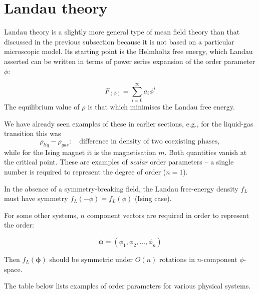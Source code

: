 \documentclass[
  letterpaper,
  enabledeprecatedfontcommands]{report}
\begin{document}
\section{Landau theory}\label{sec-landau-theory}

Landau theory is a slightly more general type of mean field theory than
that discussed in the previous subsection because it is not based on a
particular microscopic model. Its starting point is the Helmholtz free
energy, which Landau asserted can be written in terms of power series
expansion of the order parameter \(\phi\):

\[
F_(\phi)=\sum_{i=0}^{\infty}a_i\phi^i
\] The equilibrium value of \(\rho\) is that which minimises the Landau
free energy.

\begin{tcolorbox}[enhanced jigsaw, toprule=.15mm, opacityback=0, colbacktitle=quarto-callout-caution-color!10!white, title=\textcolor{quarto-callout-caution-color}{\faFire}\hspace{0.5em}{A note on order parameters}, leftrule=.75mm, rightrule=.15mm, bottomtitle=1mm, breakable, colframe=quarto-callout-caution-color-frame, colback=white, toptitle=1mm, left=2mm, titlerule=0mm, coltitle=black, arc=.35mm, bottomrule=.15mm, opacitybacktitle=0.6]

We have already seen examples of these in earlier sections, e.g., for
the liquid-gas transition this was \[
\rho_{liq} - \rho_{gas}: \quad \textrm{difference in density of two coexisting phases},
\] while for the Ising magnet it is the magnetisation \(m\). Both
quantities vanish at the critical point. These are examples of
\emph{scalar} order parameters -- a single number is required to
represent the degree of order (\(n = 1\)).

In the absence of a symmetry-breaking field, the Landau free-energy
density \(f_L\) must have symmetry \(f_L(-\phi) = f_L(\phi)\) (Ising
case).

For some other systems, \(n\) component vectors are required in order to
represent the order:

\[
\boldsymbol{\phi} = (\phi_1, \phi_2, \dots, \phi_n)
\]

Then \(f_L(\boldsymbol{\phi})\) should be symmetric under \(O(n)\)
rotations in \(n\)-component \(\phi\)-space.

The table below lists examples of order parameters for various physical
systems.


\end{tcolorbox}
\end{document}
